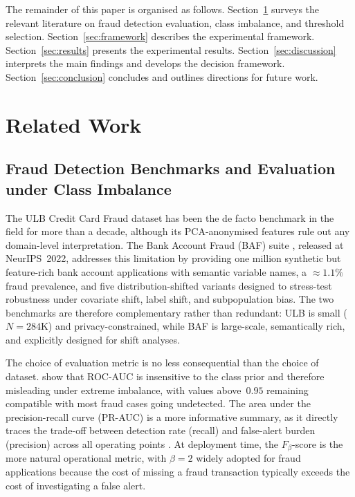 \documentclass[a4paper,fleqn]{cas-sc}
\begin{document}
The remainder of this paper is organised as follows.
Section~\ref{sec:relwork} surveys the relevant literature on fraud detection evaluation,
class imbalance, and threshold selection.
Section~\ref{sec:framework} describes the experimental framework.
Section~\ref{sec:results} presents the experimental results.
Section~\ref{sec:discussion} interprets the main findings and develops the decision
framework.
Section~\ref{sec:conclusion} concludes and outlines directions for future work.

\section{Related Work}
\label{sec:relwork}

\subsection{Fraud Detection Benchmarks and Evaluation under Class Imbalance}

The ULB Credit Card Fraud dataset \citep{dalpozzolo2015calibrating, dalpozzolo2017realistic}
has been the de facto benchmark in the field for more than a decade, although its
PCA-anonymised features rule out any domain-level interpretation.
The Bank Account Fraud (BAF) suite \citep{jesus2022turning}, released at NeurIPS~2022,
addresses this limitation by providing one million synthetic but feature-rich bank
account applications with semantic variable names, a ${\approx}1.1\%$ fraud prevalence,
and five distribution-shifted variants designed to stress-test robustness under
covariate shift, label shift, and subpopulation bias.
The two benchmarks are therefore complementary rather than redundant: ULB is small
($N\!=\!284\text{K}$) and privacy-constrained, while BAF is large-scale, semantically
rich, and explicitly designed for shift analyses.

The choice of evaluation metric is no less consequential than the choice of dataset.
\citet{saito2015precision} show that ROC-AUC is insensitive to the class prior and
therefore misleading under extreme imbalance, with values above~$0.95$ remaining
compatible with most fraud cases going undetected. The area under the precision-recall
curve (PR-AUC) is a more informative summary, as it directly traces the trade-off
between detection rate (recall) and false-alert burden (precision) across all
operating points \citep{saito2015precision, dalpozzolo2017realistic}. At deployment
time, the $F_\beta$-score \citep{rymantubb2018survey} is the more natural operational
metric, with $\beta\!=\!2$ widely adopted for fraud applications because the cost of
missing a fraud transaction typically exceeds the cost of investigating a false alert.
\end{document}
